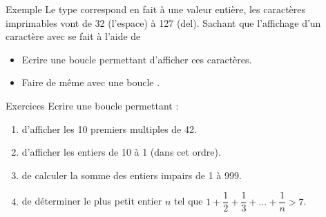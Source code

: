 \documentclass[10pt]{beamer}
\begin{document}
\begin{frame}[fragile]{\Ctitle}{\stitle}
	\begin{exampleblock}{Exemple}
		Le type  correspond en fait à une valeur entière, les caractères imprimables vont de 32 (l'espace) à 127 ({\sc del}). Sachant que l'affichage d'un caractère avec  se fait à l'aide de 
		\begin{itemize}
			\item<2-> Ecrire une boucle  permettant d'afficher ces caractères.
			\item<3-> Faire de même avec une boucle .
		\end{itemize}
	\end{exampleblock}
\end{frame}

\begin{frame}[fragile]{\Ctitle}{\stitle}
	\begin{exampleblock}{Exercices}
	Ecrire une boucle permettant :
	\begin{enumerate}
		\item<1-> d'afficher les 10 premiers multiples de 42.
		\item<2-> d'afficher les entiers de 10 à 1 (dans cet ordre).
		\item<3-> de calculer la somme des entiers impairs de 1 à 999.
		\item<4-> de déterminer le plus petit entier $n$ tel que $1 + \dfrac{1}{2} + \dfrac{1}{3} + \dots +\dfrac{1}{n} > 7$.
	\end{enumerate}
	\end{exampleblock}
\end{frame}
\end{document}

